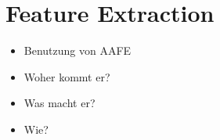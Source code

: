\section{Feature Extraction}
\label{aafe}

\begin{itemize}
	\item Benutzung von AAFE
    \item Woher kommt er?
    \item Was macht er?
    \item Wie?
\end{itemize}



